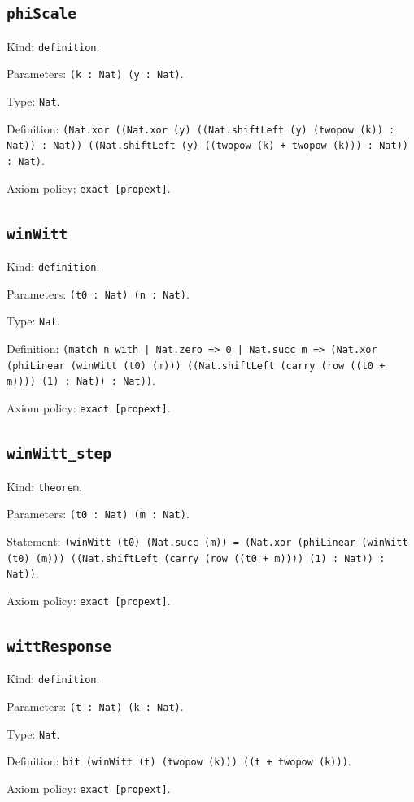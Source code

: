 \documentclass[11pt]{article}
\begin{document}
\subsection*{\texttt{phiScale}}
\noindent Kind: \texttt{definition}.\par
\noindent Parameters: \texttt{(k : Nat) (y : Nat)}.\par
\noindent Type: \texttt{Nat}.\par
\noindent Definition: \texttt{(Nat.xor ((Nat.xor (y) ((Nat.shiftLeft (y) (twopow (k)) : Nat)) : Nat)) ((Nat.shiftLeft (y) ((twopow (k) + twopow (k))) : Nat)) : Nat)}.\par
\noindent Axiom policy: \texttt{exact [propext]}.\par
\subsection*{\texttt{winWitt}}
\noindent Kind: \texttt{definition}.\par
\noindent Parameters: \texttt{(t0 : Nat) (n : Nat)}.\par
\noindent Type: \texttt{Nat}.\par
\noindent Definition: \texttt{(match n with | Nat.zero => 0 | Nat.succ m => (Nat.xor (phiLinear (winWitt (t0) (m))) ((Nat.shiftLeft (carry (row ((t0 + m)))) (1) : Nat)) : Nat))}.\par
\noindent Axiom policy: \texttt{exact [propext]}.\par
\subsection*{\texttt{winWitt\_step}}
\noindent Kind: \texttt{theorem}.\par
\noindent Parameters: \texttt{(t0 : Nat) (m : Nat)}.\par
\noindent Statement: \texttt{(winWitt (t0) (Nat.succ (m)) = (Nat.xor (phiLinear (winWitt (t0) (m))) ((Nat.shiftLeft (carry (row ((t0 + m)))) (1) : Nat)) : Nat))}.\par
\noindent Axiom policy: \texttt{exact [propext]}.\par
\subsection*{\texttt{wittResponse}}
\noindent Kind: \texttt{definition}.\par
\noindent Parameters: \texttt{(t : Nat) (k : Nat)}.\par
\noindent Type: \texttt{Nat}.\par
\noindent Definition: \texttt{bit (winWitt (t) (twopow (k))) ((t + twopow (k)))}.\par
\noindent Axiom policy: \texttt{exact [propext]}.\par
\end{document}
